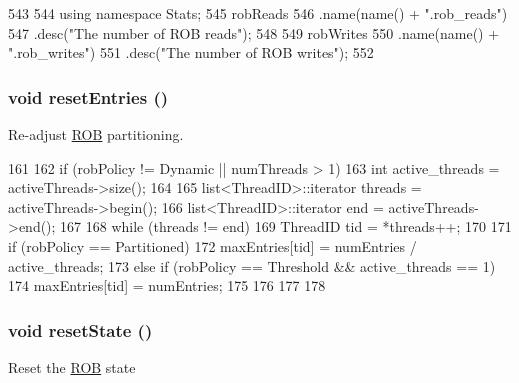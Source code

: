\begin{DoxyCode}
543 {
544     using namespace Stats;
545     robReads
546         .name(name() + ".rob_reads")
547         .desc("The number of ROB reads");
548 
549     robWrites
550         .name(name() + ".rob_writes")
551         .desc("The number of ROB writes");
552 }
\end{DoxyCode}
\hypertarget{classROB_aaf9a05771a835f9f8d634cef36e24d40}{
\subsubsection[{resetEntries}]{\setlength{\rightskip}{0pt plus 5cm}void resetEntries ()}}
\label{classROB_aaf9a05771a835f9f8d634cef36e24d40}
Re-\/adjust \hyperlink{classROB}{ROB} partitioning. 


\begin{DoxyCode}
161 {
162     if (robPolicy != Dynamic || numThreads > 1) {
163         int active_threads = activeThreads->size();
164 
165         list<ThreadID>::iterator threads = activeThreads->begin();
166         list<ThreadID>::iterator end = activeThreads->end();
167 
168         while (threads != end) {
169             ThreadID tid = *threads++;
170 
171             if (robPolicy == Partitioned) {
172                 maxEntries[tid] = numEntries / active_threads;
173             } else if (robPolicy == Threshold && active_threads == 1) {
174                 maxEntries[tid] = numEntries;
175             }
176         }
177     }
178 }
\end{DoxyCode}
\hypertarget{classROB_a755ee993c2d4e9d422c37990b15afa37}{
\subsubsection[{resetState}]{\setlength{\rightskip}{0pt plus 5cm}void resetState ()}}
\label{classROB_a755ee993c2d4e9d422c37990b15afa37}
Reset the \hyperlink{classROB}{ROB} state 


